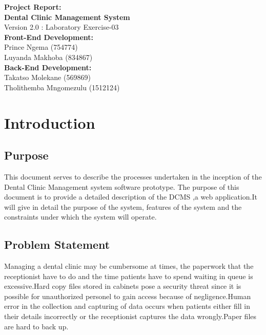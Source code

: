 \documentclass[12pt]{article}
\begin{document}
  
  \begin{titlepage}
\begin{center}
\huge{\bfseries{Project Report:}}\\
[2mm]
\huge{\bfseries{Dental Clinic Management System}}\\
Version 2.0 : Laboratory Exercise-03\\
  \vskip 0.2in
  \large{\bfseries{Front-End Development:}}\\
 Prince Ngema (754774)\\
 Luyanda Makhoba (834867) \\
 
 \large{\bfseries{Back-End Development:}}\\
 Takatso Molekane (569869)\\
 Tholithemba Mngomezulu (1512124)\\
 
\end{center}
 \end{titlepage}
 \tableofcontents
 \newpage
\section{Introduction}

\subsection{Purpose}
This document serves to describe the processes undertaken in the inception of the Dental Clinic Management system software prototype. The purpose of this document is to provide a detailed description of the DCMS ,a web application.It will give in detail the purpose of the system, features of the system  and the constraints under which the system will operate.
\subsection{Problem Statement}
Managing a dental clinic may be cumbersome at times, the paperwork that the receptionist have to do and the time  patients have to spend waiting in queue is excessive.Hard copy files stored in cabinets pose a security threat since it is possible for unauthorized personel to gain access because of negligence.Human error in the collection and capturing of data occurs when patients either fill in their details incorrectly or the receptionist captures the data wrongly.Paper files are hard to back up. 
\end{document}

